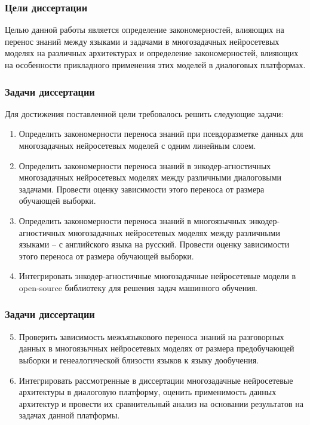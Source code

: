 \begin{frame}
    \setcounter{framenumber}{1}
    \maketitle
\end{frame}


\begin{frame}
    \frametitle{Цели диссертации}
Целью данной работы является определение закономерностей, влияющих на перенос знаний между языками и задачами в многозадачных нейросетевых моделях на различных архитектурах и определение закономерностей, влияющих на особенности прикладного применения этих моделей в диалоговых платформах.
\end{frame}

\begin{frame}
\frametitle{Задачи диссертации}
Для достижения поставленной цели требовалось решить следующие задачи:
\begin{enumerate}
  \item {Определить закономерности переноса знаний при псевдоразметке данных для многозадачных нейросетевых моделей с одним линейным слоем.}
  \item {Определить закономерности переноса знаний в энкодер-агностичных многозадачных нейросетевых моделях между различными диалоговыми задачами. Провести оценку зависимости этого переноса от размера обучающей выборки.}
  \item {Определить закономерности переноса знаний в многоязычных энкодер-агностичных многозадачных нейросетевых моделях между различными языками -- с английского языка на русский. Провести оценку зависимости этого переноса от размера обучающей выборки.}
  \item {Интегрировать энкодер-агностичные многозадачные нейросетевые модели в open-source библиотеку для решения задач машинного обучения.} 
\end{enumerate}
\end{frame}

\begin{frame}
\frametitle{Задачи диссертации}
\begin{enumerate}
\setcounter{enumi}{4}
  \item {Проверить зависимость межъязыкового переноса знаний на разговорных данных в многоязычных нейросетевых моделях от размера предобучающей выборки и генеалогической близости языков к языку дообучения.}
  \item {Интегрировать рассмотренные в диссертации многозадачные нейросетевые архитектуры в диалоговую платформу, оценить применимость данных архитектур и провести их сравнительный анализ на основании результатов на задачах данной платформы.}%
\end{enumerate}
\end{frame}


